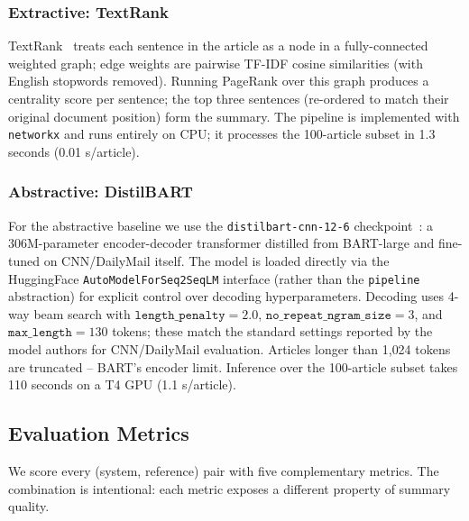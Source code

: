 \documentclass[11pt,a4paper]{article}
\begin{document}
\subsubsection{Extractive: TextRank}

TextRank~\cite{mihalcea2004textrank} treats each sentence in the
article as a node in a fully-connected weighted graph; edge weights
are pairwise TF-IDF cosine similarities (with English stopwords
removed). Running PageRank over this graph produces a centrality
score per sentence; the top three sentences (re-ordered to match
their original document position) form the summary. The pipeline is
implemented with \texttt{networkx} and runs entirely on CPU; it
processes the 100-article subset in 1.3 seconds (0.01 s/article).

\subsubsection{Abstractive: DistilBART}

For the abstractive baseline we use the \texttt{distilbart-cnn-12-6}
checkpoint~\cite{shleifer2020distilbart}: a 306M-parameter encoder-decoder
transformer distilled from BART-large and fine-tuned on CNN/DailyMail
itself. The model is loaded directly via the HuggingFace
\texttt{AutoModelForSeq2SeqLM} interface (rather than the
\texttt{pipeline} abstraction) for explicit control over decoding
hyperparameters. Decoding uses 4-way beam search with
$\texttt{length\_penalty}{=}2.0$, $\texttt{no\_repeat\_ngram\_size}{=}3$,
and $\texttt{max\_length}{=}130$ tokens; these match the standard
settings reported by the model authors for CNN/DailyMail evaluation.
Articles longer than 1{,}024 tokens are truncated -- BART's encoder
limit. Inference over the 100-article subset takes 110 seconds on a
T4 GPU (1.1 s/article).

\subsection{Evaluation Metrics}

We score every (system, reference) pair with five complementary metrics.
The combination is intentional: each metric exposes a different
property of summary quality.
\end{document}
